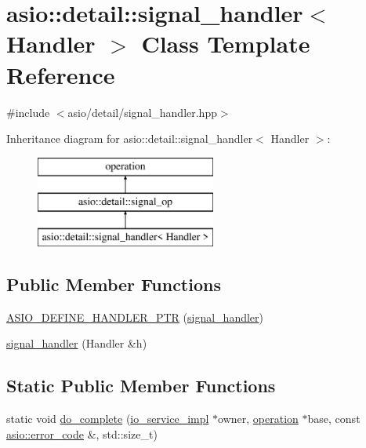 \hypertarget{classasio_1_1detail_1_1signal__handler}{}\section{asio\+:\+:detail\+:\+:signal\+\_\+handler$<$ Handler $>$ Class Template Reference}
\label{classasio_1_1detail_1_1signal__handler}


{\ttfamily \#include $<$asio/detail/signal\+\_\+handler.\+hpp$>$}

Inheritance diagram for asio\+:\+:detail\+:\+:signal\+\_\+handler$<$ Handler $>$\+:\begin{figure}[H]
\begin{center}
\leavevmode
\includegraphics[height=3.000000cm]{classasio_1_1detail_1_1signal__handler}
\end{center}
\end{figure}
\subsection*{Public Member Functions}
\begin{DoxyCompactItemize}
\item 
\hyperlink{classasio_1_1detail_1_1signal__handler_a1abf53e6268acb5e80c1c6f01bf6a7bf}{A\+S\+I\+O\+\_\+\+D\+E\+F\+I\+N\+E\+\_\+\+H\+A\+N\+D\+L\+E\+R\+\_\+\+P\+T\+R} (\hyperlink{classasio_1_1detail_1_1signal__handler}{signal\+\_\+handler})
\item 
\hyperlink{classasio_1_1detail_1_1signal__handler_a627b5088dc6f93bccd750cfe74164c9f}{signal\+\_\+handler} (Handler \&h)
\end{DoxyCompactItemize}
\subsection*{Static Public Member Functions}
\begin{DoxyCompactItemize}
\item 
static void \hyperlink{classasio_1_1detail_1_1signal__handler_a9c75f6e23bbb9abfd0393a705b3240ae}{do\+\_\+complete} (\hyperlink{namespaceasio_1_1detail_a6d61d9b8e53c11288be549d82aec5a42}{io\+\_\+service\+\_\+impl} $\ast$owner, \hyperlink{namespaceasio_1_1detail_a338968609bec20e37145309f8f9ec936}{operation} $\ast$base, const \hyperlink{classasio_1_1error__code}{asio\+::error\+\_\+code} \&, std\+::size\+\_\+t)
\end{DoxyCompactItemize}
